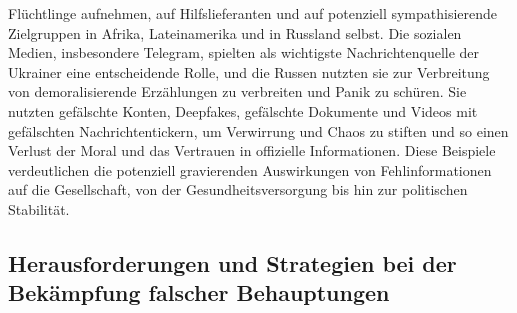 \documentclass[a4paper,listof=totoc,bibliography=totoc]{scrartcl}
\begin{document}
Flüchtlinge aufnehmen, auf Hilfslieferanten und auf potenziell sympathisierende Zielgruppen in Afrika, Lateinamerika und in Russland selbst. Die sozialen Medien, insbesondere 
Telegram, spielten als wichtigste Nachrichtenquelle der Ukrainer eine entscheidende Rolle, und die Russen nutzten sie zur Verbreitung von demoralisierende Erzählungen zu verbreiten 
und Panik zu schüren. Sie nutzten gefälschte Konten, Deepfakes, gefälschte Dokumente und Videos mit gefälschten Nachrichtentickern, um Verwirrung und Chaos zu stiften und so einen 
Verlust der Moral und das Vertrauen in offizielle Informationen.
\newline
\newline
Diese Beispiele verdeutlichen die potenziell gravierenden Auswirkungen von Fehlinformationen auf die Gesellschaft, von der Gesundheitsversorgung bis hin zur politischen Stabilität.

\subsection{Herausforderungen und Strategien bei der Bekämpfung falscher Behauptungen}
\end{document}
